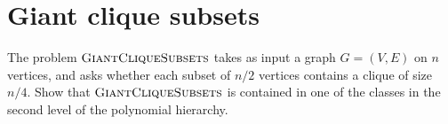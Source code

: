

\maketitle
\thispagestyle{firststyle}
\vspace{-2.0cm}

\section*{Giant clique subsets}
    The problem $\textsc{GiantCliqueSubsets}$ takes as input a graph $G = (V,E)$ on $n$ vertices, and asks whether each subset of $n/2$ vertices contains a clique of size $n/4$. Show that $\textsc{GiantCliqueSubsets}$ is contained in one of the classes in the second level of the polynomial hierarchy.
 
